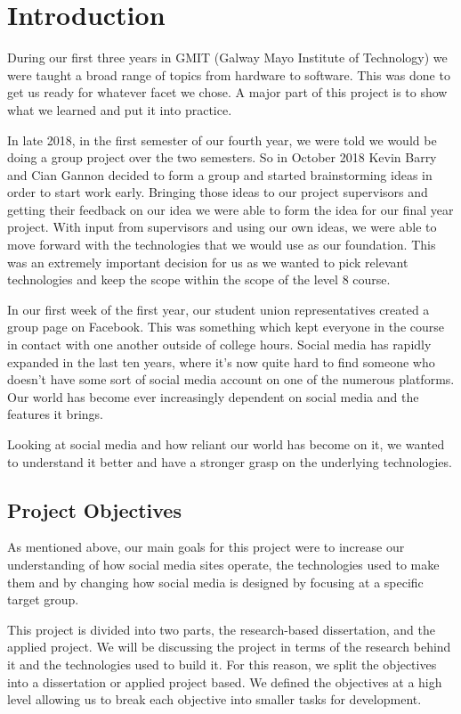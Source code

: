\chapter{Introduction}
During our first three years in GMIT (Galway Mayo Institute of Technology) we were taught a broad range of topics from hardware to software. This was done to get us ready for whatever facet we chose. A major part of this project is to show what we learned and put it into practice.

In late 2018, in the first semester of our fourth year, we were told we would be doing a group project over the two semesters. So in October 2018 Kevin Barry and Cian Gannon decided to form a group and started brainstorming ideas in order to start work early. Bringing those ideas to our project supervisors and getting their feedback on our idea we were able to form the idea for our final year project. With input from supervisors and using our own ideas, we were able to move forward with the technologies that we would use as our foundation. This was an extremely important decision for us as we wanted to pick relevant technologies and keep the scope within the scope of the level 8 course. 

In our first week of the first year, our student union representatives created a group page on Facebook. This was something which kept everyone in the course in contact with one another outside of college hours. Social media has rapidly expanded in the last ten years, where it's now quite hard to find someone who doesn't have some sort of social media account on one of the numerous platforms. Our world has become ever increasingly dependent on social media and the features it brings.

Looking at social media and how reliant our world has become on it, we wanted to understand it better and have a stronger grasp on the underlying technologies.

\section{Project Objectives} \label{objectives}
As mentioned above, our main goals for this project were to increase our understanding of how social media sites operate, the technologies used to make them and by changing how social media is designed by focusing at a specific target group.

This project is divided into two parts, the research-based dissertation, and the applied project. We will be discussing the project in terms of the research behind it and the technologies used to build it. For this reason, we split the objectives into a dissertation or applied project based. We defined the objectives at a high level allowing us to break each objective into smaller tasks for development.

